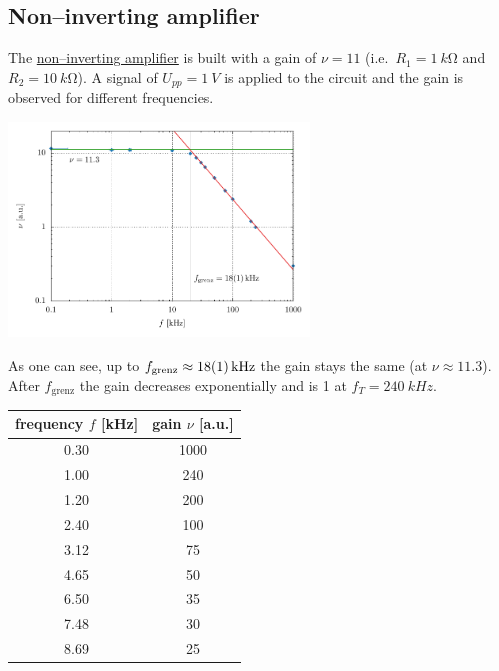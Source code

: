 \documentclass[a4paper,10pt]{article}
\newenvironment{Figure}
        {\par\medskip\noindent\minipage{\linewidth}}
        {\endminipage\par\medskip}
\numberwithin{equation}{section}
\begin{document}
\begin{multicols}{2}
        \subsection{Non--inverting amplifier}
        The \hyperref[fig:non--inverting amplifier]{non--inverting amplifier} is built with a gain of $\nu =11$ (i.e.\ $R_1=\SI{1}{k\ohm}$ and $R_2=\SI{10}{k\ohm}$).
        A signal of $U_{p p}=\SI{1}{V}$ is applied to the circuit and the gain is observed for different frequencies.
        \begin{Figure}
                \centering
                \includegraphics[width=0.6\textwidth]{../plot/5_1_2_crop.pdf}
                 \label{fig:bode-plot}
        \end{Figure}
        \noindent As one can see, up to $f_\text{grenz}\approx \SI{18+-1}{kHz}$ the gain stays the same (at $\nu \approx 11.3$).
        After $f_\text{grenz}$ the gain decreases exponentially and is 1 at $f_T=\SI{240}{kHz}$.
        \begin{center}
                \begin{tabular}{|c|c|}
                        \hline
                        frequency $f$ [kHz] & gain $\nu $ [a.u.]\\
                        \hline
                        0.30 & 1000\\
                        1.00 & 240\\
                        1.20 & 200\\
                        2.40 & 100\\
                        3.12 & 75\\
                        4.65 & 50\\
                        6.50 & 35\\
                        7.48 & 30\\
                        8.69 & 25\\

\end{tabular}
\end{center}
\end{multicols}
\end{document}
